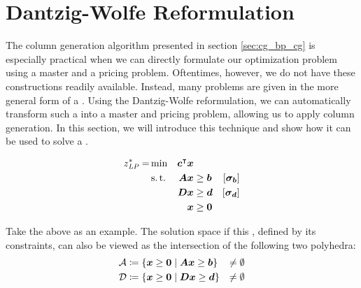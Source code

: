 \section{Dantzig-Wolfe Reformulation}\label{sec:cg_bp_dwr}
The column generation algorithm presented in section \ref{sec:cg_bp_cg} is especially practical when we can directly formulate our optimization problem using a master and a pricing problem. Oftentimes, however, we do not have these constructions readily available. Instead, many problems are given in the more general form of a \LP{}. Using the Dantzig-Wolfe reformulation, we can automatically transform such a \LP{} into a master and pricing problem, allowing us to apply column generation. In this section, we will introduce this technique and show how it can be used to solve a \LP{}.

\begin{equation}
\begin{aligned}
z^*_{\textit{LP}}{} = &\min & {\bm{c}}^\intercal {\bm{x}} & & & \\
&\operatorname{s.t.} & {\bm{A}} {\bm{x}} & \geq {\bm{b}} & \left[{\bm{\sigma}}_{\bm{b}}\right] & \\
&& {\bm{D}} {\bm{x}} & \geq {\bm{d}} & \left[{\bm{\sigma}}_{\bm{d}}\right] & \\
&& {\bm{x}} & \geq {\bm{0}}
\end{aligned}
\end{equation}

Take the above \LP{} as an example. The solution space if this \LP{}, defined by its constraints, can also be viewed as the intersection of the following two polyhedra:
\begin{equation}
\begin{aligned}
\mathcal{A} &\coloneqq \left\{ {\bm{x}} \geq {\bm{0}} \mid {\bm{A}} {\bm{x}} \geq {\bm{b}} \right\} &\neq \emptyset \\
\mathcal{D} &\coloneqq \left\{ {\bm{x}} \geq {\bm{0}} \mid {\bm{D}} {\bm{x}} \geq {\bm{d}} \right\} &\neq \emptyset
\end{aligned}
\end{equation}

